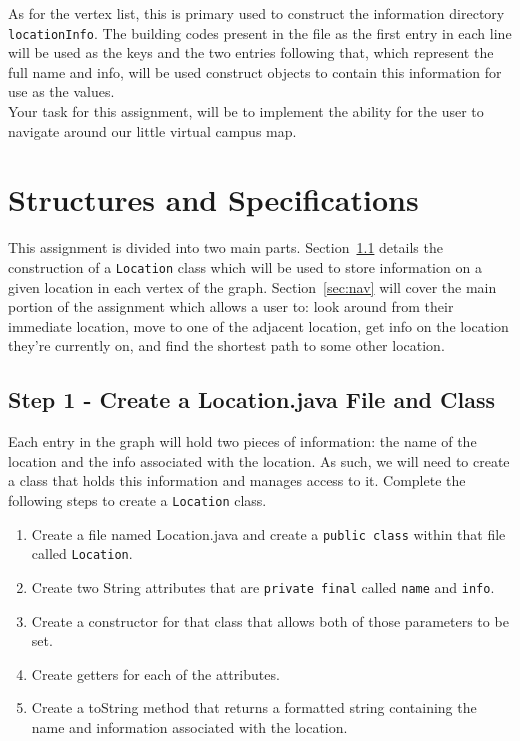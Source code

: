 \documentclass[a4paper]{article}
\begin{document}
As for the vertex list, this is primary used to construct the information
directory \lstinline|locationInfo|.  The building codes present in the file as
the first entry in each line will be used as the keys and the two entries
following that, which represent the full name and info, will be used construct
objects to contain this information for use as the values.\\

Your task for this assignment, will be to implement the ability for the user to
navigate around our little virtual campus map.



\section{Structures and Specifications}

This assignment is divided into two main parts.  Section~\ref{sec:location}
details the construction of a \lstinline|Location| class which will be used to
store information on a given location in each vertex of the graph.
Section~\ref{sec:nav} will cover the main portion of the assignment which
allows a user to: look around from their immediate location, move to one of the
adjacent location, get info on the location they're currently on, and find the
shortest path to some other location.

\subsection{Step 1 - Create a Location.java File and Class}\label{sec:location} 

Each entry in the graph will hold two pieces of information: the name of the
location and the info associated with the location. As such, we will need to create a class
that holds this information and manages access to it. Complete the following
steps to create a \lstinline|Location| class.

\begin{enumerate}
    \item Create a file named Location.java and create a \lstinline|public class| within that file called \lstinline|Location|.
    \item Create two String attributes that are \lstinline|private final| called \lstinline|name| and \lstinline|info|.
    \item Create a constructor for that class that allows both of those parameters to be set.
    \item Create getters for each of the attributes.
    \item Create a toString method that returns a formatted string containing the name and information associated with the location.
\end{enumerate}
\end{document}
